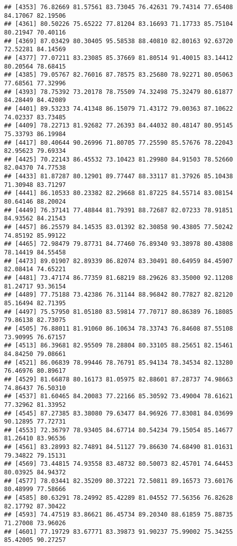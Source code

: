 \documentclass[
]{article}
\begin{document}
\begin{verbatim}
## [4353] 76.82669 81.57561 83.73045 76.42631 79.74314 77.65408 84.17067 82.19506
## [4361] 80.50226 75.65222 77.81204 83.16693 71.17733 85.75104 80.21947 70.40116
## [4369] 87.03429 80.30405 95.58538 88.40810 82.80163 92.63720 72.52281 84.14569
## [4377] 77.07211 83.23085 85.37669 81.80514 91.40015 83.14412 80.20564 78.68415
## [4385] 79.05767 82.76016 87.78575 83.25680 78.92271 80.05063 77.68561 77.32996
## [4393] 78.75392 73.20178 78.75509 74.32498 75.32479 80.61877 84.28449 84.42089
## [4401] 89.53233 74.41348 86.15079 71.43172 79.00363 87.10622 74.02337 83.73485
## [4409] 78.22713 81.92682 77.26393 84.44032 80.48147 80.95145 75.33793 86.19984
## [4417] 80.40644 90.26996 71.80705 77.25590 85.57676 78.22043 82.95623 79.69334
## [4425] 70.22143 86.45532 73.10423 81.29980 84.91503 78.52660 82.04370 74.77538
## [4433] 81.87287 80.12901 89.77447 88.33117 81.37926 85.10438 71.30948 83.71297
## [4441] 86.10533 80.23382 82.29668 81.87225 84.55714 83.08154 80.64146 88.20024
## [4449] 76.37141 77.48844 81.79391 88.72687 82.07233 78.91851 84.93562 84.21543
## [4457] 86.25579 84.14535 83.01392 82.30858 90.43805 77.50242 74.85192 85.99122
## [4465] 72.98479 79.87731 84.77460 76.89340 93.38978 80.43808 78.14419 84.55458
## [4473] 89.01907 82.89339 86.82074 83.30491 80.64959 84.45907 82.08414 74.65221
## [4481] 73.47174 86.77359 81.68219 88.29626 83.35000 92.11208 81.24717 93.36154
## [4489] 77.75188 73.42386 76.31144 88.96842 80.77827 82.82120 85.16494 82.71395
## [4497] 75.57950 81.05180 83.59814 77.70717 80.86389 76.18085 79.86138 82.73075
## [4505] 76.88011 81.91060 86.10634 78.33743 76.84608 87.55108 73.90995 76.67157
## [4513] 86.39681 82.95509 78.28804 80.33105 88.25651 82.15461 84.84250 79.08661
## [4521] 86.06839 78.99446 78.76791 85.94134 78.34534 82.13280 76.46976 80.89617
## [4529] 81.66878 80.16173 81.05975 82.88601 87.28737 74.98663 74.86437 76.50310
## [4537] 81.60465 84.20083 77.22166 85.30592 73.49004 78.61621 77.32962 81.33952
## [4545] 87.27385 83.38080 79.63477 84.96926 77.83081 84.03699 90.12895 77.72731
## [4553] 72.36797 78.93405 84.67714 80.54234 79.15054 85.14677 81.26410 83.96536
## [4561] 83.28993 82.74891 84.51127 79.86630 74.68490 81.01631 79.34822 79.15131
## [4569] 73.44815 74.93558 83.48732 80.50073 82.45701 74.64453 80.03925 84.94372
## [4577] 78.03441 82.35209 80.37221 72.50811 89.16573 73.60176 80.48999 77.58666
## [4585] 80.63291 78.24992 85.42289 81.04552 77.56356 76.82628 82.17792 87.30422
## [4593] 74.47519 83.86621 86.45734 89.20340 88.61859 75.88735 71.27008 73.96026
## [4601] 77.19729 83.67771 83.39873 91.90237 75.99002 75.34255 85.42005 90.27257

\end{verbatim}
\end{document}
